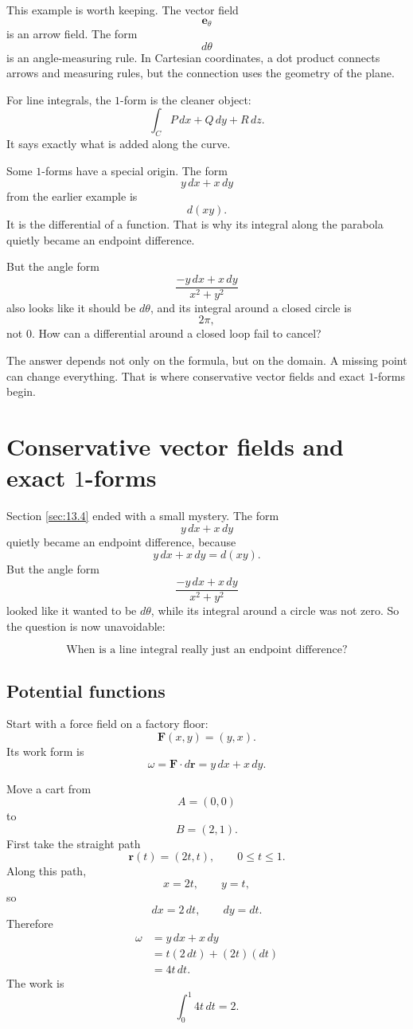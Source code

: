 This example is worth keeping.  The vector field
\[
    \mathbf e_\theta
\]
is an arrow field.  The form
\[
    d\theta
\]
is an angle-measuring rule.  In Cartesian coordinates, a dot product connects arrows
and measuring rules, but the connection uses the geometry of the plane.

For line integrals, the \(1\)-form is the cleaner object:
\[
    \int_C P\,dx+Q\,dy+R\,dz.
\]
It says exactly what is added along the curve.

Some \(1\)-forms have a special origin.  The form
\[
    y\,dx+x\,dy
\]
from the earlier example is
\[
    d(xy).
\]
It is the differential of a function.  That is why its integral along the parabola quietly
became an endpoint difference.

But the angle form
\[
    \frac{-y\,dx+x\,dy}{x^2+y^2}
\]
also looks like it should be \(d\theta\), and its integral around a closed circle is
\[
    2\pi,
\]
not \(0\).  How can a differential around a closed loop fail to cancel?

The answer depends not only on the formula, but on the domain.  A missing point can
change everything.  That is where conservative vector fields and exact \(1\)-forms
begin.
\section{Conservative vector fields and exact \(1\)-forms}
\label{sec:13.5}

Section \ref{sec:13.4} ended with a small mystery.  The form
\[
    y\,dx+x\,dy
\]
quietly became an endpoint difference, because
\[
    y\,dx+x\,dy=d(xy).
\]
But the angle form
\[
    \frac{-y\,dx+x\,dy}{x^2+y^2}
\]
looked like it wanted to be \(d\theta\), while its integral around a circle was not zero.
So the question is now unavoidable:

\[
    \text{When is a line integral really just an endpoint difference?}
\]

\subsection{Potential functions}

Start with a force field on a factory floor:
\[
    \mathbf F(x,y)=(y,x).
\]
Its work form is
\[
    \omega=\mathbf F\cdot d\mathbf r=y\,dx+x\,dy.
\]

Move a cart from
\[
    A=(0,0)
\]
to
\[
    B=(2,1).
\]
First take the straight path
\[
    \mathbf r(t)=(2t,t),
    \qquad 0\le t\le1.
\]
Along this path,
\[
    x=2t,\qquad y=t,
\]
so
\[
    dx=2\,dt,\qquad dy=dt.
\]
Therefore
\[
\begin{aligned}
\omega
&=
y\,dx+x\,dy\\
&=
t(2\,dt)+(2t)(dt)\\
&=
4t\,dt.
\end{aligned}
\]
The work is
\[
    \int_0^1 4t\,dt=2.
\]

